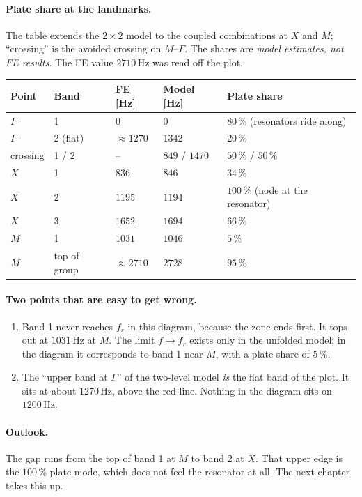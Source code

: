 \paragraph{Plate share at the landmarks.}
The table extends the $2\times 2$ model to the coupled combinations at $X$ and
$M$; ``crossing'' is the avoided crossing on $M$--$\Gamma$. The shares are \emph{model estimates, not FE results}. The FE value
$2710\,\mathrm{Hz}$ was read off the plot.
\begin{center}
\begin{tabular}{|l|l|l|l|p{}|}
\hline
Point & Band & FE [Hz] & Model [Hz] & Plate share \\
\hline
$\Gamma$ & 1 & $0$ & $0$ & $80\,\%$ (resonators ride along) \\
$\Gamma$ & 2 (flat) & $\approx 1270$ & $1342$ & $20\,\%$ \\
crossing & 1 / 2 & -- & $849$ / $1470$ & $50\,\%$ / $50\,\%$ \\
$X$ & 1 & $836$ & $846$ & $34\,\%$ \\
$X$ & 2 & $1195$ & $1194$ & $100\,\%$ (node at the resonator) \\
$X$ & 3 & $1652$ & $1694$ & $66\,\%$ \\
$M$ & 1 & $1031$ & $1046$ & $5\,\%$ \\
$M$ & top of group & $\approx 2710$ & $2728$ & $95\,\%$ \\
\hline
\end{tabular}
\end{center}

\paragraph{Two points that are easy to get wrong.}
\begin{enumerate}
  \item Band 1 never reaches $f_r$ in this diagram, because the zone ends first.
        It tops out at $1031\,\mathrm{Hz}$ at $M$. The limit $f \to f_r$ exists
        only in the unfolded model; in the diagram it corresponds to band 1
        near $M$, with a plate share of $5\,\%$.
  \item The ``upper band at $\Gamma$'' of the two-level model \emph{is} the flat
        band of the plot. It sits at about $1270\,\mathrm{Hz}$, above the red
        line. Nothing in the diagram sits on $1200\,\mathrm{Hz}$.
\end{enumerate}

\paragraph{Outlook.}
The gap runs from the top of band 1 at $M$ to band 2 at $X$. That upper edge is
the $100\,\%$ plate mode, which does not feel the resonator at all. The next
chapter takes this up.

